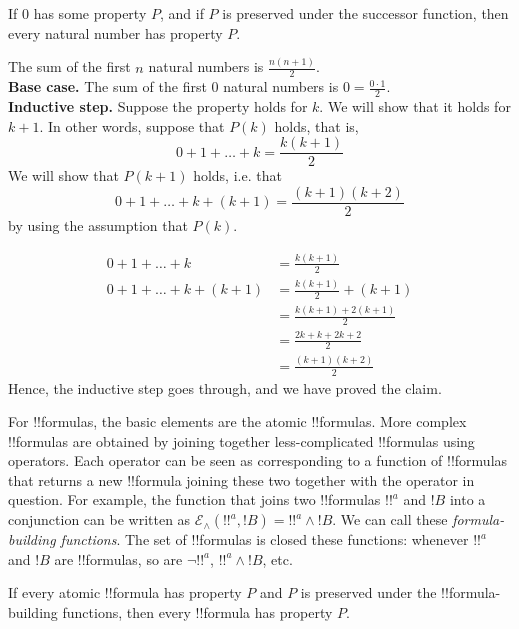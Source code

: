 \documentclass[../../include/open-logic-section]{subfiles}
\begin{document}
\begin{defn}
If 0 has some property $P$, and if $P$ is preserved under the
successor function, then every natural number has property $P$.
\end{defn}

\begin{ex} The sum of the first $n$ natural numbers is $\frac{n(n+1)}{2}$. \\

\textbf{Base case.} The sum of the first 0 natural numbers is $0=
\frac{0\cdot 1}{2}$.\\

\textbf{Inductive step.} Suppose the property holds for $k$. We will
show that it holds for $k+1$. In other words, suppose that $P(k)$
holds, that is,
\[ 0 + 1 + \ldots + k = \frac{k(k+1)}{2} \]
We will show that $P(k+1)$ holds, i.e. that
\[ 0 + 1 + \ldots + k + (k+1) = \frac{(k+1)(k+2)}{2} \]
by using the assumption that $P(k)$.

\begin{align*}
0 + 1 + \ldots + k &= \frac{k(k+1)}{2} \tag{Assumption} \\
0 + 1 + \ldots + k + (k+1) &= \frac{k(k+1)}{2} + (k+1)
\tag{Add $k+1$ to both sides} \\
&= \frac{k(k+1) + 2(k+1)}{2} \\
&= \frac{2k + k + 2k +2}{2} \\
&=\frac{(k+1)(k+2)}{2}
\end{align*}
Hence, the inductive step goes through, and we have proved the claim.
\end{ex}

\begin{explain}
For !!{formula}s, the basic elements are the atomic !!{formula}s. More
complex !!{formula}s are obtained by joining together less-complicated
!!{formula}s using operators. Each operator can be seen as
corresponding to a function of !!{formula}s that returns a new
!!{formula} joining these two together with the operator in
question. For example, the function that joins two !!{formula}s $!!^a$
and $!B$ into a conjunction can be written as $\mathcal E _\land (!!^a,
!B) = !!^a \land !B$. We can call these \emph{formula-building
  functions}. The set of !!{formula}s is closed these functions:
whenever $!!^a$ and $!B$ are !!{formula}s, so are $\lnot !!^a$, $!!^a \land
!B$, etc.
\end{explain}

\begin{defn}
If every atomic !!{formula} has property $P$ and $P$ is preserved
under the !!{formula}-building functions, then every !!{formula} has
property $P$.
\end{defn}
\end{document}
